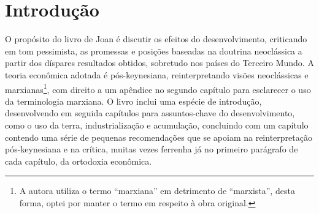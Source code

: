 	
	
	
	\textual
	
	
	\chapter{Introdução}
	
	
	O propósito do livro de Joan  é discutir os efeitos do desenvolvimento, criticando em tom pessimista, as promessas e posições baseadas na doutrina neoclássica a partir dos díspares resultados obtidos, sobretudo nos países do Terceiro Mundo. A teoria econômica adotada é pós-keynesiana, reinterpretando visões neoclássicas e marxianas\footnote{A autora utiliza o termo ``marxiana'' em detrimento de ``marxista'', desta forma, optei por manter o termo em respeito à obra original.}, com direito a um apêndice no segundo capítulo para esclarecer o uso da terminologia marxiana. O livro inclui uma espécie de introdução, desenvolvendo em seguida capítulos para assuntos-chave do desenvolvimento, como o uso da terra, industrialização e acumulação, concluindo com um capítulo contendo uma série de pequenas recomendações que se apoiam na reinterpretação pós-keynesiana e na crítica, muitas vezes ferrenha já no primeiro parágrafo de cada capítulo, da ortodoxia econômica.
	
